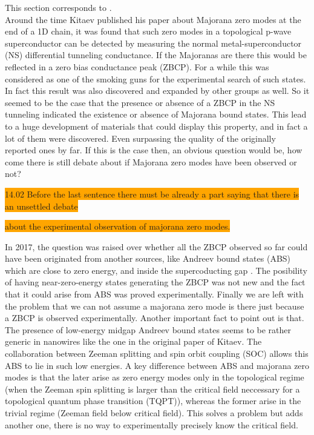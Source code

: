 This section corresponds to \cite{2019Lai}.\\

Around the time Kitaev published his paper about Majorana zero modes at the end of a 1D chain, it was found that such zero modes in a topological p-wave superconductor can be detected by measuring the normal metal-superconductor (NS) differential tunneling conductance. If the Majoranas are there this would be reflected in a zero bias conductance peak (ZBCP). For a while this was considered as one of the smoking guns for the experimental search of such states. In fact this result was also discovered and expanded by other groups as well. So it seemed to be the case that the presence or absence of a ZBCP in the NS tunneling indicated the existence or absence of Majorana bound states. This lead to a huge development of materials that could display this property, and in fact a lot of them were discovered. Even surpassing the quality of the originally reported ones by far. If this is the case then, an obvious question would be, how come there is still debate about if Majorana zero modes have been observed or not?

\colorbox{orange}{14.02 Before the last sentence there must be already a part saying that there is an unsettled debate}

\colorbox{orange}{about the experimental observation of majorana zero modes.}

In 2017, the question was raised over whether all the ZBCP observed so far could have been originated from another sources, like Andreev bound states (ABS) which are close to zero energy, and inside the supercoducting gap \cite{PhysRevB.96.075161}. The posibility of having near-zero-energy states generating the ZBCP was not new and the fact that it could arise from ABS was proved experimentally. Finally we are left with the problem that we can not assume  a majorana zero mode is there just because a ZBCP is observed experimentally. Another important fact to point out is that. The presence of low-energy midgap Andreev bound states seems to be rather generic in nanowires like the one in the original paper of Kitaev. The collaboration between Zeeman splitting and spin orbit coupling (SOC) allows this ABS to lie in such low energies. A key difference between ABS and majorana zero modes is that the later arise as zero energy modes only in the topological regime (when the Zeeman spin splitting is larger than the critical field neccessary for a topological quantum phase transition (TQPT)), whereas the former arise in the trivial regime (Zeeman field below critical field). This solves a problem but adds another one, there is no way to experimentally precisely know the critical field.\\


